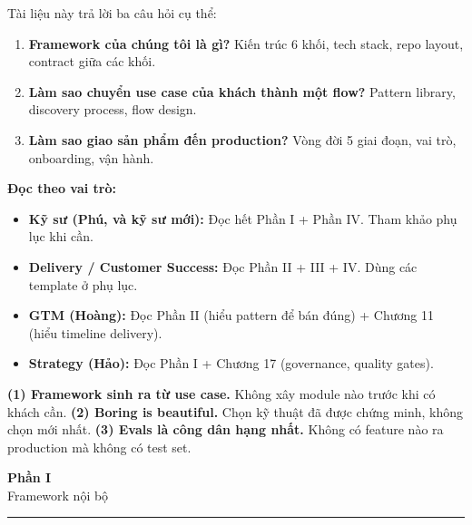 \documentclass[11pt,a4paper]{article}
\begin{document}
Tài liệu này trả lời ba câu hỏi cụ thể:

\begin{enumerate}
\item \textbf{Framework của chúng tôi là gì?} Kiến trúc 6 khối, tech stack,
repo layout, contract giữa các khối.
\item \textbf{Làm sao chuyển use case của khách thành một flow?} Pattern
library, discovery process, flow design.
\item \textbf{Làm sao giao sản phẩm đến production?} Vòng đời 5 giai đoạn,
vai trò, onboarding, vận hành.
\end{enumerate}

\textbf{Đọc theo vai trò:}
\begin{itemize}
\item \textbf{Kỹ sư (Phú, và kỹ sư mới):} Đọc hết Phần I + Phần IV. Tham khảo phụ lục khi cần.
\item \textbf{Delivery / Customer Success:} Đọc Phần II + III + IV. Dùng các template ở phụ lục.
\item \textbf{GTM (Hoàng):} Đọc Phần II (hiểu pattern để bán đúng) + Chương 11 (hiểu timeline delivery).
\item \textbf{Strategy (Hảo):} Đọc Phần I + Chương 17 (governance, quality gates).
\end{itemize}

\begin{keybox}[title=3 nguyên tắc xuyên suốt]
\textbf{(1) Framework sinh ra từ use case.} Không xây module nào trước khi có
khách cần. \textbf{(2) Boring is beautiful.} Chọn kỹ thuật đã được chứng minh,
không chọn mới nhất. \textbf{(3) Evals là công dân hạng nhất.} Không có
feature nào ra production mà không có test set.
\end{keybox}

\clearpage

\begin{center}
\vspace*{0.5em}
{\sffamily\bfseries\Huge\color{ink} Phần I}\\[0.5em]
{\sffamily\LARGE\color{mid} Framework nội bộ}\\[0.5em]
{\color{mid}\rule{6cm}{0.4pt}}
\end{center}
\vspace{1em}

\end{document}
